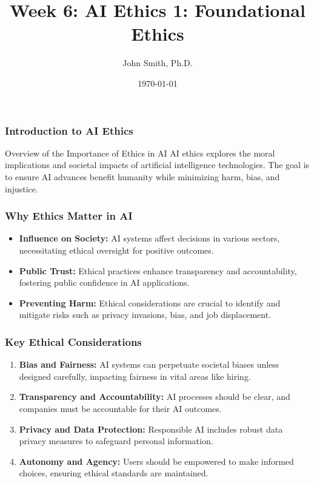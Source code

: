 \documentclass[aspectratio=169]{beamer}
\title[AI Ethics]{Week 6: AI Ethics 1: Foundational Ethics}
\author[J. Smith]{John Smith, Ph.D.}
\institute[University Name]{
  Department of Computer Science\\
  University Name\\
  \vspace{0.3cm}
  Email: email@university.edu\\
  Website: www.university.edu
}
\date{\today}
\begin{document}
\frame{\titlepage}

\begin{frame}[fragile]
    \frametitle{Introduction to AI Ethics}
    \begin{block}{Overview of the Importance of Ethics in AI}
        AI ethics explores the moral implications and societal impacts of artificial intelligence technologies. The goal is to ensure AI advances benefit humanity while minimizing harm, bias, and injustice.
    \end{block}
\end{frame}

\begin{frame}[fragile]
    \frametitle{Why Ethics Matter in AI}
    \begin{itemize}
        \item \textbf{Influence on Society:} 
        AI systems affect decisions in various sectors, necessitating ethical oversight for positive outcomes.
        
        \item \textbf{Public Trust:} 
        Ethical practices enhance transparency and accountability, fostering public confidence in AI applications.
        
        \item \textbf{Preventing Harm:} 
        Ethical considerations are crucial to identify and mitigate risks such as privacy invasions, bias, and job displacement.
    \end{itemize}
\end{frame}

\begin{frame}[fragile]
    \frametitle{Key Ethical Considerations}
    \begin{enumerate}
        \item \textbf{Bias and Fairness:} 
        AI systems can perpetuate societal biases unless designed carefully, impacting fairness in vital areas like hiring.
        
        \item \textbf{Transparency and Accountability:} 
        AI processes should be clear, and companies must be accountable for their AI outcomes.
        
        \item \textbf{Privacy and Data Protection:} 
        Responsible AI includes robust data privacy measures to safeguard personal information.
        
        \item \textbf{Autonomy and Agency:} 
        Users should be empowered to make informed choices, ensuring ethical standards are maintained.
    \end{enumerate}
\end{frame}
\end{document}

